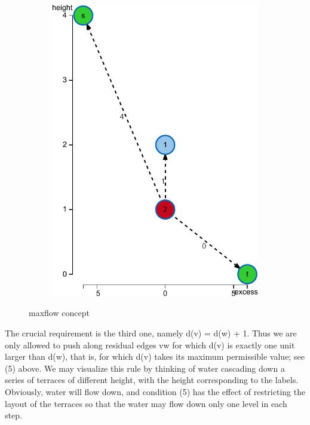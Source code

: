 \begin{figure}
\begin{subfigure}[t]{0.45\textwidth}
\includegraphics[width=\textwidth]{fig/maxflow-graph-algorithm-height}
\end{subfigure}
\caption{maxflow concept}
\label{fig:maxflow}
\end{figure}


The crucial requirement is the third one, namely d(v) = d(w) + 1. Thus we are only allowed to push along residual edges vw for which d(v) is exactly one unit larger than d(w), that is, for which d(v) takes its maximum permissible value; see (5) above. We may visualize this rule by thinking of water cascading down a series of terraces of different height, with the height corresponding to the labels. Obviously, water will flow down, and condition (5) has the effect of restricting the layout of the terraces so that the water may flow down only one level in each step. \cite{jungnickel2013graphs,6.6}



